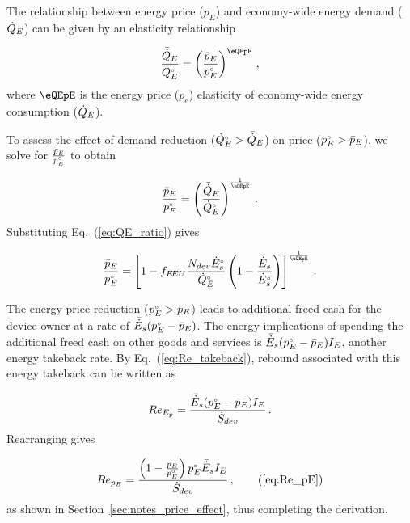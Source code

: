 The relationship between energy price ($p_E$) and
economy-wide energy demand ($\dot{Q}_E$)
can be given by an elasticity relationship

\begin{equation}
  \frac{\rainc{Q}_E}{\rorig{Q}_E} = 
          \left( \frac{\ainc{p}_E}{\orig{p}_E} \right)^{\eQEpE} \, ,
\end{equation}
%
where $\eQEpE$ is the energy price ($p_e$) elasticity
of economy-wide energy consumption ($\dot{Q}_E$).

To assess the effect of demand reduction
(${}{\dot{Q}}^{\scriptscriptstyle \circ}_E > \bar{\dot{Q}}_E$)
on price
(${}{p}^{\scriptscriptstyle \circ}_E > \bar{p}_E$),
we solve for $\frac{\bar{p}_E}{{}{p}^{\scriptscriptstyle \circ}_E}$
to obtain

\begin{equation}
  \frac{\ainc{p}_E}{\orig{p}_E} =
        \left( \frac{\rainc{Q}_E}{\rorig{Q}_E} \right)^{\frac{1}{\eQEpE}} \, .
\end{equation}
%
Substituting Eq.~(\ref{eq:QE_ratio}) gives

\begin{equation}
  \frac{\ainc{p}_E}{\orig{p}_E} =
        \left[ 1 - f_{\EEU} \frac{N_{dev} \rbempl{E}_s}{\rbempl{Q}_E} \left( 1 - \frac{\rainc{E}_s}{\rbempl{E}_s}  \right) \right]^{\frac{1}{\eQEpE}} \, .
\end{equation}

The energy price reduction (${}{p}^{\scriptscriptstyle \circ}_E > \bar{p}_E$)
leads to additional freed cash for the device owner at a rate of
$\bar{\dot{E}}_s ({}{p}^{\scriptscriptstyle \circ}_E - \bar{p}_E)$.
The energy implications of spending the additional freed cash
on other goods and services is
$\bar{\dot{E}}_s ({}{p}^{\scriptscriptstyle \circ}_E - \bar{p}_E) I_E$,
another energy takeback rate.
By Eq.~(\ref{eq:Re_takeback}),
rebound associated with this energy takeback
can be written as

\begin{equation}
  Re_{E_p} = \frac{\bar{\dot{E}}_s ({}{p}^{\scriptscriptstyle \circ}_E - \bar{p}_E) I_E}{\dot{S}_{dev}} \, .
\end{equation}
%
Rearranging gives

\begin{equation}
  Re_{p_E} = \frac{\left(1 - \frac{\ainc{p}_E}{\bempl{p}_E}\right) \orig{p}_E \rainc{E}_s I_E}{\Sdot} \, ,  \tag{\ref{eq:Re_pE}}
\end{equation}
%
as shown in Section~\ref{sec:notes_price_effect},
thus completing the derivation.



